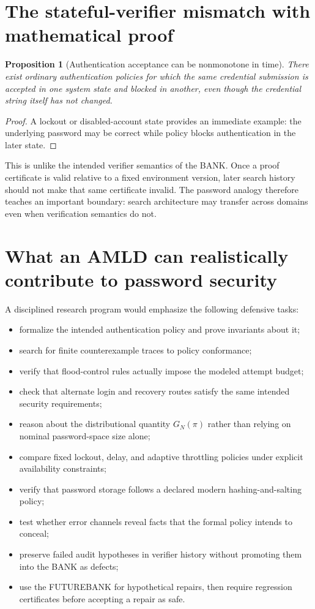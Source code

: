 \documentclass[11pt,openany]{book}
\newtheorem{proposition}[theorem]{Proposition}
\theoremstyle{definition}
\theoremstyle{remark}
\begin{document}
\section{The stateful-verifier mismatch with mathematical proof}
\begin{proposition}[Authentication acceptance can be nonmonotone in time]\label{prop:authnonmono}
There exist ordinary authentication policies for which the same credential submission is accepted in one system state and blocked in another, even though the credential string itself has not changed.
\end{proposition}
\begin{proof}
A lockout or disabled-account state provides an immediate example: the underlying password may be correct while policy blocks authentication in the later state.
\end{proof}

This is unlike the intended verifier semantics of the BANK. Once a proof certificate is valid relative to a fixed environment version, later search history should not make that same certificate invalid. The password analogy therefore teaches an important boundary: search architecture may transfer across domains even when verification semantics do not.

\section{What an AMLD can realistically contribute to password security}
A disciplined research program would emphasize the following defensive tasks:
\begin{itemize}
\item formalize the intended authentication policy and prove invariants about it;
\item search for finite counterexample traces to policy conformance;
\item verify that flood-control rules actually impose the modeled attempt budget;
\item check that alternate login and recovery routes satisfy the same intended security requirements;
\item reason about the distributional quantity $G_N(\pi)$ rather than relying on nominal password-space size alone;
\item compare fixed lockout, delay, and adaptive throttling policies under explicit availability constraints;
\item verify that password storage follows a declared modern hashing-and-salting policy;
\item test whether error channels reveal facts that the formal policy intends to conceal;
\item preserve failed audit hypotheses in verifier history without promoting them into the BANK as defects;
\item use the FUTUREBANK for hypothetical repairs, then require regression certificates before accepting a repair as safe.
\end{itemize}
\end{document}
